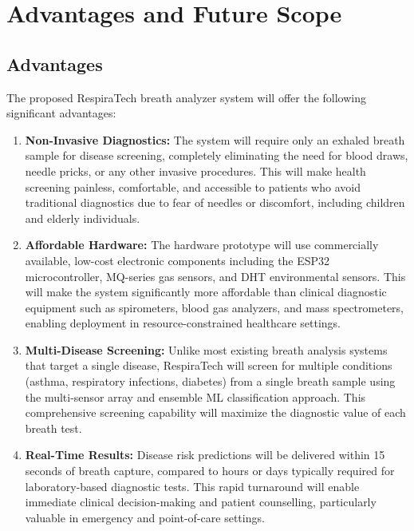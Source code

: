 \chapter{Advantages and Future Scope}

\section{Advantages}
The proposed RespiraTech breath analyzer system will offer the following significant advantages:

\begin{enumerate}[leftmargin=1.5cm]
\item \textbf{Non-Invasive Diagnostics:} The system will require only an exhaled breath sample for disease screening, completely eliminating the need for blood draws, needle pricks, or any other invasive procedures. This will make health screening painless, comfortable, and accessible to patients who avoid traditional diagnostics due to fear of needles or discomfort, including children and elderly individuals.

\item \textbf{Affordable Hardware:} The hardware prototype will use commercially available, low-cost electronic components including the ESP32 microcontroller, MQ-series gas sensors, and DHT environmental sensors. This will make the system significantly more affordable than clinical diagnostic equipment such as spirometers, blood gas analyzers, and mass spectrometers, enabling deployment in resource-constrained healthcare settings.

\item \textbf{Multi-Disease Screening:} Unlike most existing breath analysis systems that target a single disease, RespiraTech will screen for multiple conditions (asthma, respiratory infections, diabetes) from a single breath sample using the multi-sensor array and ensemble ML classification approach. This comprehensive screening capability will maximize the diagnostic value of each breath test.

\item \textbf{Real-Time Results:} Disease risk predictions will be delivered within 15 seconds of breath capture, compared to hours or days typically required for laboratory-based diagnostic tests. This rapid turnaround will enable immediate clinical decision-making and patient counselling, particularly valuable in emergency and point-of-care settings.


\end{enumerate}

